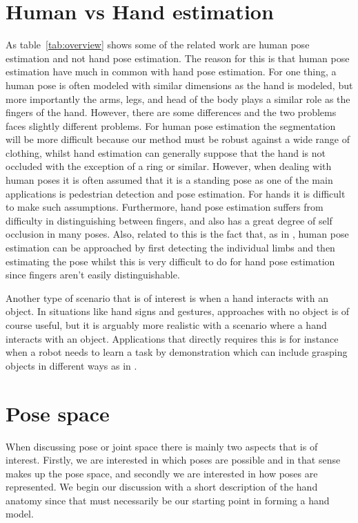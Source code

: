 \documentclass[a4paper,11pt]{kth-mag}
\begin{document}
\section{Human vs Hand estimation}
As table~\ref{tab:overview} shows some of the related work are human pose estimation and not hand pose estimation.
The reason for this is that human pose estimation have much in common with hand pose estimation.
For one thing, a human pose is often modeled with similar dimensions as the hand is modeled, but more importantly the arms, legs, and head of the body plays a similar role as the fingers of the hand.
However, there are some differences and the two problems faces slightly different problems.
For human pose estimation the segmentation will be more difficult because our method must be robust against a wide range of clothing, whilst hand estimation can generally suppose that the hand is not occluded with the exception of a ring or similar.
However, when dealing with human poses it is often assumed that it is a standing pose as one of the main applications is pedestrian detection and pose estimation.
For hands it is difficult to make such assumptions.
Furthermore, hand pose estimation suffers from difficulty in distinguishing between fingers, and also has a great degree of self occlusion in many poses. 
Also, related to this is the fact that, as in \cite{combining}, human pose estimation can be approached by first detecting the individual limbs and then estimating the pose whilst this is very difficult to do for hand pose estimation since fingers aren't easily distinguishable.

Another type of scenario that is of interest is when a hand interacts with an object.
In situations like hand signs and gestures, approaches with no object is of course useful, but it is arguably more realistic with a scenario where a hand interacts with an object.
Applications that directly requires this is for instance when a robot needs to learn a task by demonstration which can include grasping objects in different ways as in \cite{fullDOF}.


\section{Pose space}
When discussing pose or joint space there is mainly two aspects that is of interest.
Firstly, we are interested in which poses are possible and in that sense makes up the pose space, and secondly we are interested in how poses are represented.
We begin our discussion with a short description of the hand anatomy since that must necessarily be our starting point in forming a hand model.
\end{document}
